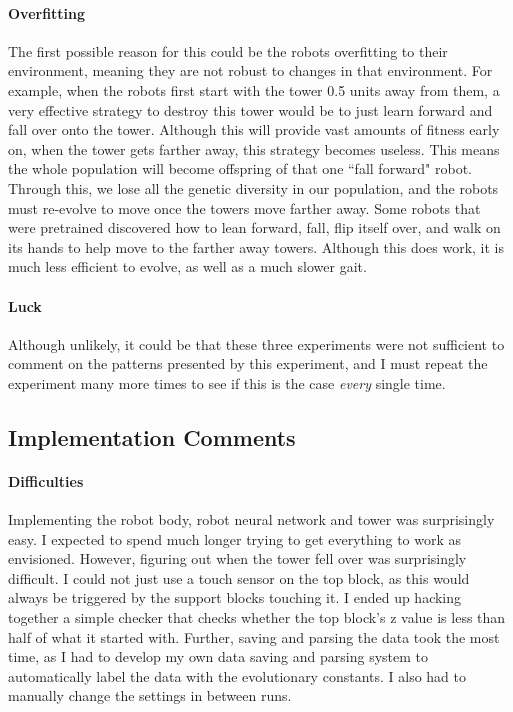 \documentclass[12pt, a4paper]{article}
\begin{document}
\paragraph{Overfitting}
The first possible reason for this could be the robots overfitting to their environment, meaning they are not robust to changes in that environment. For example, when the robots first start with the tower 0.5 units away from them, a very effective strategy to destroy this tower would be to just learn forward and fall over onto the tower. Although this will provide vast amounts of fitness early on, when the tower gets farther away, this strategy becomes useless. This means the whole population will become offspring of that one ``fall forward" robot. Through this, we lose all the genetic diversity in our population, and the robots must re-evolve to move once the towers move farther away. Some robots that were pretrained discovered how to lean forward, fall, flip itself over, and walk on its hands to help move to the farther away towers. Although this does work, it is much less efficient to evolve, as well as a much slower gait.

\paragraph{Luck}
Although unlikely, it could be that these three experiments were not sufficient to comment on the patterns presented by this experiment, and I must repeat the experiment many more times to see if this is the case \emph{every} single time.

\subsection{Implementation Comments}
\paragraph{Difficulties} Implementing the robot body, robot neural network and tower was surprisingly easy. I expected to spend much longer trying to get everything to work as envisioned. However, figuring out when the tower fell over was surprisingly difficult. I could not just use a touch sensor on the top block, as this would always be triggered by the support blocks touching it. I ended up hacking together a simple checker that checks whether the top block's z value is less than half of what it started with. Further, saving and parsing the data took the most time, as I had to develop my own data saving and parsing system to automatically label the data with the evolutionary constants. I also had to manually change the settings in between runs.
\end{document}
